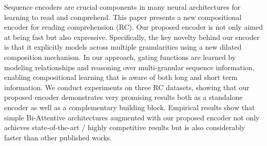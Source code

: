 Sequence encoders are crucial components in many neural architectures for learning to read and comprehend. This paper presents a new compositional encoder for reading comprehension (RC). Our proposed encoder is not only aimed at being fast but also expressive. Specifically, the key novelty behind our encoder is that it explicitly models across multiple granularities using a new dilated composition mechanism. In our approach, gating functions are learned by modeling relationships and reasoning over multi-granular sequence information, enabling compositional learning that is aware of both long and short term information. We conduct experiments on three RC datasets, showing that our proposed encoder demonstrates very promising results both as a standalone encoder as well as a complementary building block. Empirical results show that simple Bi-Attentive architectures augmented with our proposed encoder not only achieves state-of-the-art / highly competitive results but is also considerably faster than other published works.
